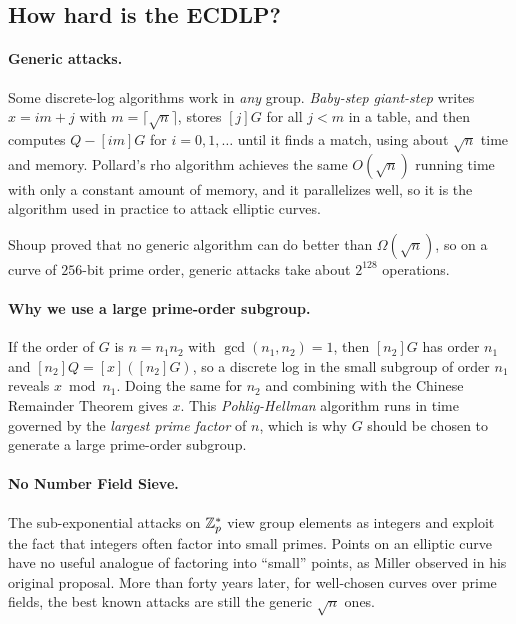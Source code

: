 \subsection{How hard is the ECDLP?}

\paragraph{Generic attacks.}
Some discrete-log algorithms work in \emph{any} group.
\emph{Baby-step giant-step} writes $x = im + j$ with
$m = \lceil \sqrt{n} \rceil$, stores $[j]G$ for all $j < m$ in a table,
and then computes $Q - [im]G$ for $i = 0, 1, \dots$ until it finds a
match, using about $\sqrt{n}$ time and memory.
Pollard's rho algorithm\autocite{Pollard78} achieves the same
$O(\sqrt{n})$ running time with only a constant amount of memory, and it
parallelizes well, so it is the algorithm used in practice to attack
elliptic curves.

Shoup proved that no generic algorithm can do better than
$\Omega(\sqrt{n})$,\autocite{Shoup97} so on a curve of $256$-bit prime
order, generic attacks take about $2^{128}$ operations.

\paragraph{Why we use a large prime-order subgroup.}
If the order of $G$ is $n = n_1 n_2$ with $\gcd(n_1, n_2) = 1$, then
$[n_2]G$ has order $n_1$ and $[n_2]Q = [x]([n_2]G)$, so a discrete log in
the small subgroup of order $n_1$ reveals $x \bmod n_1$. Doing the same
for $n_2$ and combining with the Chinese Remainder Theorem gives $x$.
This \emph{Pohlig-Hellman} algorithm\autocite{PohligHellman78} runs in
time governed by the \emph{largest prime factor} of $n$, which is why $G$
should be chosen to generate a large prime-order subgroup.

\paragraph{No Number Field Sieve.}
The sub-exponential attacks on $\mathbb{Z}^*_p$ view group elements as integers
and exploit the fact that integers often factor into small primes.
Points on an elliptic curve have no useful analogue of factoring into
``small'' points, as Miller observed in his original
proposal.\autocite{Miller85}
More than forty years later, for well-chosen curves over prime fields, the
best known attacks are still the generic $\sqrt{n}$ ones.


